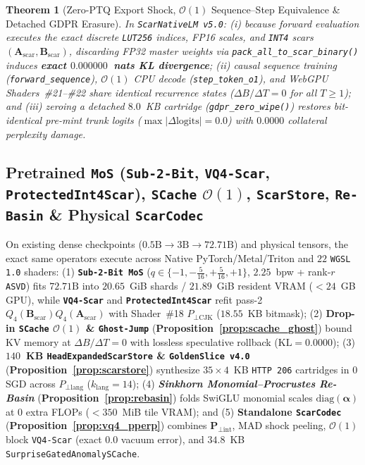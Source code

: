 \documentclass[10pt,twocolumn]{article}
\newtheorem{theorem}{Theorem}
\begin{document}
\begin{theorem}[Zero-PTQ Export Shock, $\mathcal{O}(1)$ Sequence--Step Equivalence \& Detached GDPR Erasure]
\label{thm:scarnative}
In \texttt{ScarNativeLM v5.0}: (i) because forward evaluation executes the exact discrete \texttt{LUT256} indices, FP16 scales, and \texttt{INT4} scars $(\mathbf{A}_{\text{scar}}, \mathbf{B}_{\text{scar}})$, discarding FP32 master weights via \texttt{pack\_all\_to\_scar\_binary()} induces \textbf{exact $0.000000$~nats KL divergence}; (ii) causal sequence training (\texttt{forward\_sequence}), $\mathcal{O}(1)$ CPU decode (\texttt{step\_token\_o1}), and WebGPU Shaders~\#21--\#22 share identical recurrence states ($\Delta B / \Delta T = 0$ for all $T \ge 1$); and (iii) zeroing a detached $8.0$~KB cartridge (\texttt{gdpr\_zero\_wipe()}) restores bit-identical pre-mint trunk logits ($\max|\Delta\text{logits}| = 0.0$) with $0.0000$ collateral perplexity damage.
\end{theorem}

\subsection{Pretrained \texttt{MoS} (\texttt{Sub-2-Bit}, \texttt{VQ4-Scar}, \texttt{ProtectedInt4Scar}), \texttt{SCache} $\mathcal{O}(1)$, \texttt{ScarStore}, \texttt{Re-Basin} \& Physical \texttt{ScarCodec}}
On existing dense checkpoints ($0.5\text{B} \to 3\text{B} \to 72.71\text{B}$) and physical tensors, the exact same operators execute across Native PyTorch/Metal/Triton and $22$ \texttt{WGSL 1.0} shaders:
(1) \textbf{\texttt{Sub-2-Bit MoS}} ($q \in \{-1, -\tfrac{5}{16}, +\tfrac{5}{16}, +1\}$, $2.25$~bpw + rank-$r$ \texttt{ASVD}) fits $72.71\text{B}$ into $20.65$~GiB shards / $21.89$~GiB resident VRAM ($<24$~GB GPU), while \textbf{\texttt{VQ4-Scar}} and \textbf{\texttt{ProtectedInt4Scar}} refit pass-2 $Q_4(\mathbf{B}_{\text{scar}})Q_4(\mathbf{A}_{\text{scar}})$ with Shader~\#18 $P_{\perp\text{CJK}}$ ($18.55$~KB bitmask);
(2) \textbf{Drop-in \texttt{SCache} $\mathcal{O}(1)$ \& \texttt{Ghost-Jump}} (\textbf{Proposition~\ref{prop:scache_ghost}}) bound KV memory at $\Delta B/\Delta T = 0$ with lossless speculative rollback ($\mathrm{KL}=0.0000$);
(3) \textbf{$140$~KB \texttt{HeadExpandedScarStore} \& \texttt{GoldenSlice v4.0}} (\textbf{Proposition~\ref{prop:scarstore}}) synthesize $35\times 4$~KB \texttt{HTTP 206} cartridges in $0$ SGD across $P_{\perp\text{lang}}$ ($k_{\text{lang}}=14$);
(4) \textbf{\emph{Sinkhorn Monomial--Procrustes Re-Basin}} (\textbf{Proposition~\ref{prop:rebasin}}) folds SwiGLU monomial scales $\mathrm{diag}(\boldsymbol{\alpha})$ at $0$ extra FLOPs ($<350$~MiB tile VRAM); and
(5) \textbf{Standalone \texttt{ScarCodec}} (\textbf{Proposition~\ref{prop:vq4_pperp}}) combines $\mathbf{P}_{\perp\text{int}}$, MAD shock peeling, $\mathcal{O}(1)$ block \texttt{VQ4-Scar} (exact $0.0$ vacuum error), and $34.8$~KB \texttt{SurpriseGatedAnomalySCache}.
\end{document}
